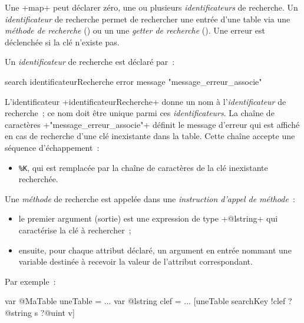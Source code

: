 
Une \ggst+map+ peut déclarer zéro, une ou plusieurs \emph{identificateurs} de recherche. Un \emph{identificateur} de recherche permet de rechercher une entrée d'une table via une \emph{méthode de recherche} () ou un  une \emph{getter de recherche} (). Une erreur est déclenchée si la clé n'existe pas.


Un \emph{identificateur} de recherche est déclaré par~:


\begin{galgas3}
search identificateurRecherche error message "message_erreur_associe"
\end{galgas3}

\begin{galgas4}
\end{galgas4}

L'identificateur \ggst+identificateurRecherche+ donne un nom à l'\emph{identificateur} de recherche~; ce nom doit être unique parmi ces \emph{identificateurs}. La chaîne de caractères \ggst+"message_erreur_associe"+ définit le message d'erreur qui est affiché en cas de recherche d'une clé inexistante dans la table. Cette chaîne accepte une séquence d'échappement~:
\begin{itemize}
  \item \texttt{\%K}, qui est remplacée par la chaîne de caractères de la clé inexistante recherchée.
\end{itemize}






Une \emph{méthode} de recherche est appelée dans une \emph{instruction d'appel de méthode}~:
\begin{itemize}
  \item le premier argument (sortie) est une expression de type \ggst+@lstring+ qui caractérise la clé à rechercher~;
  \item ensuite, pour chaque attribut déclaré, un argument en entrée nommant une variable destinée à recevoir la valeur de l'attribut correspondant.
\end{itemize}

Par exemple~:

\begin{galgas3}
var @MaTable uneTable = {}
...
var @lstring clef = ...
[uneTable searchKey !clef ?@string s ?@uint v]
\end{galgas3}


